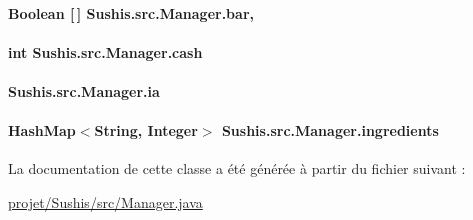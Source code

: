 \paragraph[{bar}]{\setlength{\rightskip}{0pt plus 5cm}Boolean \mbox{[}$\,$\mbox{]} Sushis.\+src.\+Manager.\+bar\hspace{0.3cm}{\ttfamily [static]}, {\ttfamily [private]}}\label{classSushis_1_1src_1_1Manager_ae135bee329f98bc9bad9ca62f6bb3d92}
\hypertarget{classSushis_1_1src_1_1Manager_ae59b41a9619054cec5ce56cbbde77f30}{}
\paragraph[{cash}]{\setlength{\rightskip}{0pt plus 5cm}int Sushis.\+src.\+Manager.\+cash\hspace{0.3cm}{\ttfamily [private]}}\label{classSushis_1_1src_1_1Manager_ae59b41a9619054cec5ce56cbbde77f30}
\hypertarget{classSushis_1_1src_1_1Manager_a1b807b964e5abf15e84f7bec47b3d7d5}{}
\paragraph[{ia}]{ Sushis.\+src.\+Manager.\+ia\hspace{0.3cm}{\ttfamily [private]}}\label{classSushis_1_1src_1_1Manager_a1b807b964e5abf15e84f7bec47b3d7d5}
\hypertarget{classSushis_1_1src_1_1Manager_aeb7c5ea92c4658cf9001a6a3c0f8022c}{}
\paragraph[{ingredients}]{\setlength{\rightskip}{0pt plus 5cm}Hash\+Map$<$String, Integer$>$ Sushis.\+src.\+Manager.\+ingredients\hspace{0.3cm}{\ttfamily [private]}}\label{classSushis_1_1src_1_1Manager_aeb7c5ea92c4658cf9001a6a3c0f8022c}


La documentation de cette classe a été générée à partir du fichier suivant \+:\begin{DoxyCompactItemize}
\item 
\hyperlink{projet_2Sushis_2src_2Manager_8java}{projet/\+Sushis/src/\+Manager.\+java}\end{DoxyCompactItemize}
